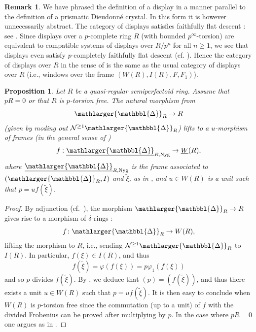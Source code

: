 \documentclass{amsart}
\newcommand{\prism}{{\mathlarger{\mathbbl{\Delta}}}}
\theoremstyle{plain}
\newtheorem{proposition}[theorem]{Proposition}
\theoremstyle{definition}
\newtheorem{remark}[theorem]{Remark}
\newcommand{\tilxi}{\tilde{\xi}}
\newcommand{\red}[1]{{\color{black} #1}}
\newcommand{\green}[1]{{\color{black}#1}}
\begin{document}
\begin{remark} \label{descent-for-displays} \green{We have phrased the definition of a display in a manner parallel to the definition of a prismatic Dieudonn\'e crystal. In this form it is however unnecessarily abstract.}
The category of displays satisfies faithfully flat descent : see \cite[Theorem 37]{zink_the_display_of_a_formal_p_divisible_group}. Since displays over a $p$-complete ring $R$ (with bounded $p^{\infty}$-torsion) are equivalent to compatible systems of displays over $R/p^n$ for all $n\geq 1$, we see that displays even satisfy $p$-completely faithfully flat descent (cf. \cite[Corollary 4.8]{bhatt_morrow_scholze_topological_hochschild_homology}). Hence the category of displays over $R$ in the sense of  is the same as the usual category of displays over $R$ (i.e., windows over the frame $(W(R),I(R),F,F_1)$).  
\end{remark}


\begin{proposition}
\label{qrsp-p-tf-frames}
Let $R$ be a quasi-regular semiperfectoid ring. Assume that $pR=0$ or that $R$ is $p$-torsion free. The natural morphism from  
\[ \prism_R \to R \]
(given by moding out $\mathcal{N}^{\geq 1} \prism_R$) lifts to a \red{$u$-morphism of frames (in the general sense of \Cref{frame})}
\[  f: \underline{\prism}_{R,\rm Nyg} \to \underline{W}(R), \]
where $\underline{\prism}_{R,\rm Nyg}$ is the frame associated to $(\prism_R,I)$ and $\tilde{\xi}$, as in , \red{and $u \in W(R)$ is a unit such that $p=uf(\tilxi)$}.
\end{proposition}
\begin{proof}
By adjunction (cf.\ \cite[Theoreme 4]{joyal_delta_anneaux_et_vecteurs_de_witt}), the morphism $\prism_R \to R$ gives rise to a morphism of $\delta$-rings :
\[ f\colon \prism_R \to W(R), \]
lifting the morphism to $R$, i.e., sending $\mathcal{N}^{\geq 1} \prism_R$ to $I(R)$. In particular, $f(\xi) \in I(R)$, and thus
\[ f(\tilxi) = \varphi(f(\xi)) = p \varphi_1(f(\xi)) \]
and so $p$ divides $f(\tilxi)$. By \cite[Lemma 2.24]{bhatt_scholze_prisms_and_prismatic_cohomology}, \red{we deduce that $(p)=(f(\tilxi))$, and thus there exists a unit $u\in W(R)$ such that $p=uf(\tilxi)$}. It is then easy to conclude when $W(R)$ is $p$-torsion free since the commutation (up to a unit) of $f$ with the divided Frobenius can be proved after multiplying by $p$. In the case where $pR=0$ one argues as in \cite[Lemma 7.4]{lau_dieudonne_theory_over_semiperfect_rings_and_perfectoid_rings}.   
\end{proof}
\end{document}
